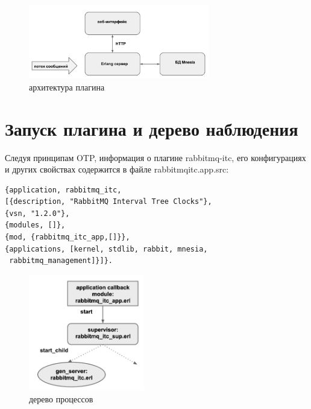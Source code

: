 \begin{figure}
\centering
\includegraphics[width=0.7\textwidth]{img/struct.png}
\caption{архитектура плагина}
\end{figure}
\section{Запуск плагина и дерево наблюдения}
Следуя принципам OTP, информация о плагине rabbitmq-itc, его конфигурациях и других свойствах содержится в файле rabbitmq\underline{\hspace{0.25cm}}itc.app.src:
\begin{lstlisting}
{application, rabbitmq_itc,
[{description, "RabbitMQ Interval Tree Clocks"},
{vsn, "1.2.0"},
{modules, []},
{mod, {rabbitmq_itc_app,[]}},
{applications, [kernel, stdlib, rabbit, mnesia,
 rabbitmq_management]}]}.
\end{lstlisting}
\begin{figure}
\centering
\includegraphics[width=0.45\textwidth]{img/sup.png}
\caption{дерево процессов}
\end{figure}
